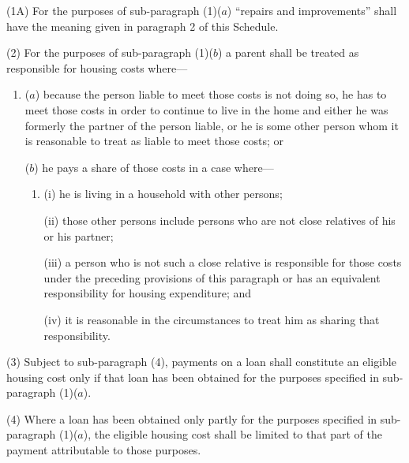 \documentclass[12pt,a4paper]{article}
\begin{document}
(1A) For the purposes of sub-paragraph (1)($a$) “repairs and improvements” shall have the meaning given in paragraph 2 of this Schedule.

(2) For the purposes of sub-paragraph (1)($b$) a parent shall be treated as responsible for housing costs where—
\begin{enumerate}\item[]
($a$) because the person liable to meet those costs is not doing so, he has to meet those costs in order to continue to live in the home and either he was formerly the partner of the person liable, or he is some other person whom it is reasonable to treat as liable to meet those costs; or

($b$) he pays a share of those costs in a case where—
\begin{enumerate}\item[]
(i) he is living in a household with other persons;

(ii) those other persons include persons who are not close relatives of his or his partner;

(iii) a person who is not such a close relative is responsible for those costs under the preceding provisions of this paragraph or has an equivalent responsibility for housing expenditure; and

(iv) it is reasonable in the circumstances to treat him as sharing that responsibility.
\end{enumerate}
\end{enumerate}

(3) Subject to sub-paragraph (4), payments on a loan shall constitute an eligible housing cost only if that loan has been obtained for the purposes specified in sub-paragraph (1)($a$).

(4) Where a loan has been obtained only partly for the purposes specified in sub-paragraph (1)($a$), the eligible housing cost shall be limited to that part of the payment attributable to those purposes.

\end{document}
